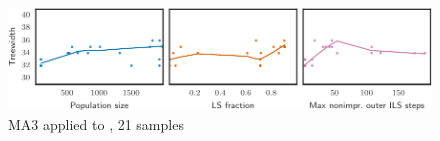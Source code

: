 \begin{figure}[h]\strictpagecheck\centering

\includegraphics[scale=0.85]{plots/MA3-correlation-regplots-games120-0-crop.pdf}


\caption[Parameter influence for MA3 when applied to ]{\gls{MA3} applied to , 21 samples}

\label{MA3-correlation-regplots-games120}

\end{figure}